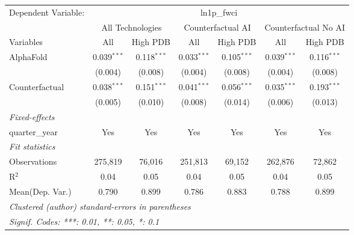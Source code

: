 \begingroup
\centering
\begin{tabular}{lcccccc}
   \tabularnewline \midrule \midrule
   Dependent Variable: & \multicolumn{6}{c}{ln1p\_fwci}\\
 & \multicolumn{2}{c}{All Technologies} & \multicolumn{2}{c}{Counterfactual AI} & \multicolumn{2}{c}{Counterfactual No AI} \\
\cmidrule(lr){1-1}\cmidrule(lr){2-3} \cmidrule(lr){4-5} \cmidrule(lr){6-7}
Variables & \multicolumn{1}{c}{All} & \multicolumn{1}{c}{High PDB} & \multicolumn{1}{c}{All} & \multicolumn{1}{c}{High PDB} & \multicolumn{1}{c}{All} & \multicolumn{1}{c}{High PDB} \\
\cmidrule(lr){1-1}\cmidrule(lr){2-2} \cmidrule(lr){3-3} \cmidrule(lr){4-4} \cmidrule(lr){5-5} \cmidrule(lr){6-6} \cmidrule(lr){7-7}
   AlphaFold      & 0.039$^{***}$ & 0.118$^{***}$ & 0.033$^{***}$ & 0.105$^{***}$ & 0.039$^{***}$ & 0.116$^{***}$\\   
                  & (0.004)       & (0.008)       & (0.004)       & (0.008)       & (0.004)       & (0.008)\\   
   Counterfactual & 0.038$^{***}$ & 0.151$^{***}$ & 0.041$^{***}$ & 0.056$^{***}$ & 0.035$^{***}$ & 0.193$^{***}$\\   
                  & (0.005)       & (0.010)       & (0.008)       & (0.014)       & (0.006)       & (0.013)\\   
   \midrule
   \emph{Fixed-effects}\\
   quarter\_year  & Yes           & Yes           & Yes           & Yes           & Yes           & Yes\\  
   \midrule
   \emph{Fit statistics}\\
   Observations   & 275,819       & 76,016        & 251,813       & 69,152        & 262,876       & 72,862\\  
   R$^2$          & 0.04          & 0.05          & 0.04          & 0.05          & 0.04          & 0.05\\  
Mean(Dep. Var.) & 0.790 & 0.899 & 0.786 & 0.883 & 0.788 & 0.899 \\
   \midrule \midrule
   \multicolumn{7}{l}{\emph{Clustered (author) standard-errors in parentheses}}\\
   \multicolumn{7}{l}{\emph{Signif. Codes: ***: 0.01, **: 0.05, *: 0.1}}\\
\end{tabular}
\par\endgroup
